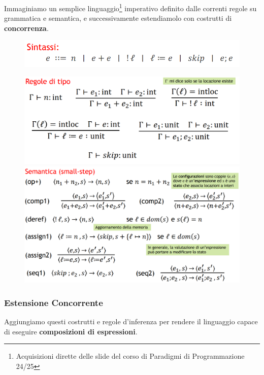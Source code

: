 \documentclass{article}
\begin{document}
Immaginiamo un semplice linguaggio\footnote{Acquisizioni dirette delle slide del corso di Paradigmi di Programmazione 24/25} imperativo definito dalle correnti regole su grammatica e semantica, e successivamente estendiamolo con costrutti di \textbf{concorrenza}.

\begin{figure}[htbp]
    \center
    \includegraphics[scale=0.4]{img/sintassi_modello.png}
\end{figure}

\begin{figure}[htbp]
    \center
    \includegraphics[scale=0.2]{img/semantica1_modello.png}
    \includegraphics[scale=0.2]{img/semantica2_modello.png}
\end{figure}

\newpage

\subsubsection{Estensione Concorrente}

Aggiungiamo questi costrutti e regole d'inferenza per rendere il linguaggio capace di eseguire \textbf{composizioni di espressioni}.
\end{document}
